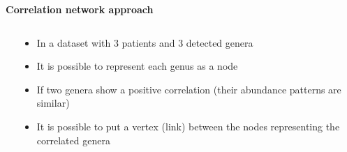 \documentclass[10pt]{beamer}
\begin{document}
\begin{frame}
	\vspace{2mm}
	\textbf{\Large{Correlation network approach}}
	\vspace{1mm}
	\pause
	\begin{columns}
		\begin{column}{0.5\textwidth}
			\begin{overlayarea}{\textwidth}{0.8\textheight}
				\begin{center}
				
				
				
				\end{center}
			\end{overlayarea}
		\end{column}
		\begin{column}{0.5\textwidth}
			\begin{overlayarea}{\textwidth}{0.8\textheight}
				\begin{itemize}
					\vspace{8mm}
					\item<2-> In a dataset with 3 patients and 3 detected genera
					\item<3-> It is possible to represent each genus as a node
					\item<4-> If two genera show a positive correlation (their abundance patterns are similar)
					\item<5-> It is possible to put a vertex (link) between the nodes representing the correlated genera	
				\end{itemize}
			\end{overlayarea}
		\end{column}
	\end{columns}
\end{frame}
\end{document}
